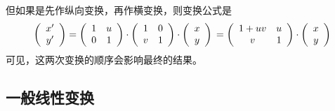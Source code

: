 但如果是先作纵向变换，再作横变换，则变换公式是
\begin{equation*}
  \left(
    \begin{array}{c}
      x' \\
      y'
    \end{array}
  \right)
    = 
    \left(
      \begin{array}{cc}
        1 & u \\
        0 & 1
      \end{array}
    \right)
\cdot
    \left(
      \begin{array}{cc}
        1 & 0 \\
        v & 1
      \end{array}
    \right)
 \cdot
  \left(
    \begin{array}{c}
      x \\
      y
    \end{array}
  \right)
  \\
   = 
     \left(
      \begin{array}{cc}
        1+uv & u \\
        v & 1
      \end{array}
    \right)
 \cdot
  \left(
    \begin{array}{c}
      x \\
      y
    \end{array}
  \right)
\end{equation*}
可见，这两次变换的顺序会影响最终的结果。


\subsection{一般线性变换}
\label{sec:two-dimension-linear-translation}

